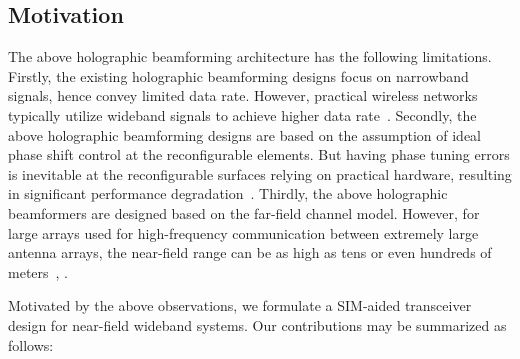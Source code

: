 \documentclass[lettersize,journal]{IEEEtran}
\theoremstyle{remark}
\begin{document}
\subsection{Motivation}
The above holographic beamforming architecture has the following limitations. Firstly, the existing holographic beamforming designs focus on narrowband signals, hence convey limited data rate. However, practical wireless networks typically utilize wideband signals to achieve higher data rate~\cite{kaiser2009overview}. Secondly, the above holographic beamforming designs are based on the assumption of ideal phase shift control at the reconfigurable elements. But having phase tuning errors is inevitable at the reconfigurable surfaces relying on practical hardware, resulting in significant performance degradation~\cite{badiu2019communication}. Thirdly, the above holographic beamformers are designed based on the far-field channel model. However, for large arrays used for high-frequency communication between extremely large antenna arrays, the near-field range can be as high as tens or even hundreds of meters~\cite{cui2022near}, \cite{an2023toward_beamfocusing}.

Motivated by the above observations, we formulate a SIM-aided transceiver design for near-field wideband systems. Our contributions may be summarized as follows:
\end{document}
